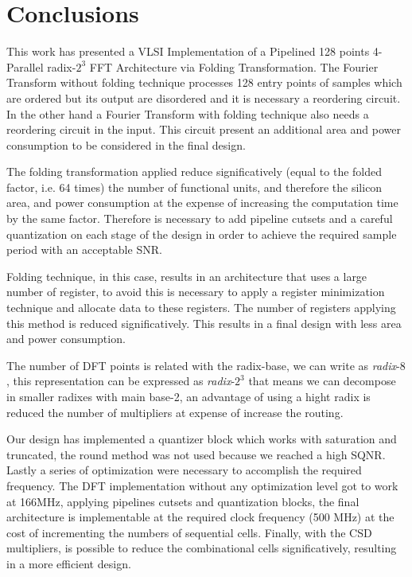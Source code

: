 \documentclass[journal,comsoc]{IEEEtran}
\begin{document}

\FloatBarrier
  
\section{Conclusions}\label{sec:conclusions}
This work has presented a VLSI Implementation of a Pipelined 128 points 4-Parallel radix-$2^3$ FFT Architecture via Folding Transformation. The Fourier Transform without folding technique processes 128 entry points of samples which are ordered but its output are disordered and it is necessary a reordering circuit. In the other hand a Fourier Transform with folding technique also needs a reordering circuit in the input. This circuit present an additional area and power consumption to be considered in the final design. 

The folding transformation applied reduce significatively (equal to the folded factor, i.e. 64 times) the number of functional units, and therefore the silicon area, and power consumption at the expense of increasing the computation time by the same factor. Therefore is necessary to add pipeline cutsets and a careful quantization on each stage of the design in order to achieve the required sample period with an acceptable SNR.

Folding technique, in this case, results in an architecture that uses a large number of register, to avoid this is necessary to apply a register minimization technique and allocate data to these registers. The number of registers applying this method is reduced significatively. This results in a final design with less area and power consumption.

The number of DFT points is related with the radix-base, we can write as \textit{radix}-$8$, this representation can be expressed as \textit{radix}-$2^3$ that means we can decompose in smaller radixes with main base-2, an advantage of using a hight radix is reduced the number of multipliers at expense of increase the routing.

Our design has implemented a quantizer block which works with saturation and truncated, the round method was not used because we reached a high SQNR. Lastly a series of optimization were necessary to accomplish the required frequency. The DFT implementation without any optimization level got to work at 166MHz, applying pipelines cutsets and quantization blocks, the final architecture is implementable at the required clock frequency (500 MHz) at the cost of incrementing the numbers of sequential cells. Finally, with the CSD multipliers, is possible to reduce the combinational cells significatively, resulting in a more efficient design. 





\end{document}

